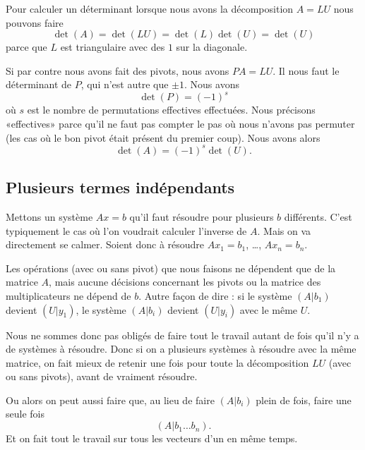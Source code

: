 Pour calculer un déterminant lorsque nous avons la décomposition \( A=LU\) nous pouvons faire
\begin{equation}
    \det(A)=\det(LU)=\det(L)\det(U)=\det(U)
\end{equation}
parce que \( L\) est triangulaire avec des \( 1\) sur la diagonale.

Si par contre nous avons fait des pivots, nous avons \( PA=LU\). Il nous faut le déterminant de \( P\), qui n'est autre que \( \pm 1\). Nous avons
\begin{equation}
    \det(P)=(-1)^s
\end{equation}
où \( s\) est le nombre de permutations effectives effectuées. Nous précisons «effectives» parce qu'il ne faut pas compter le pas où nous n'avons pas permuter (les cas où le bon pivot était présent du premier coup). Nous avons alors
\begin{equation}
    \det(A)=(-1)^s\det(U).
\end{equation}

\subsection{Plusieurs termes indépendants}

Mettons un système \( Ax=b\) qu'il faut résoudre pour plusieurs \( b\) différents. C'est typiquement le cas où l'on voudrait calculer l'inverse de \( A\). Mais on va directement se calmer. Soient donc à résoudre \( Ax_1=b_1\), \ldots, \( Ax_n=b_n\).

Les opérations (avec ou sans pivot) que nous faisons ne dépendent que de la matrice \( A\), mais aucune décisions concernant les pivots ou la matrice des multiplicateurs ne dépend de \( b\). Autre façon de dire : si le système \(  (A|b_1)  \) devient \( (U|y_1)\), le système \( (A|b_i)\) devient \( (U|y_i)\) avec le même \( U\).

Nous ne sommes donc pas obligés de faire tout le travail autant de fois qu'il n'y a de systèmes à résoudre. Donc si on a plusieurs systèmes à résoudre avec la même matrice, on fait mieux de retenir une fois pour toute la décomposition \( LU\) (avec ou sans pivots), avant de vraiment résoudre.

Ou alors on peut aussi faire que, au lieu de faire \( (A|b_i)\) plein de fois, faire une seule fois
\begin{equation}
    (A|b_1\ldots b_n).
\end{equation}
Et on fait tout le travail sur tous les vecteurs d'un en même temps.

